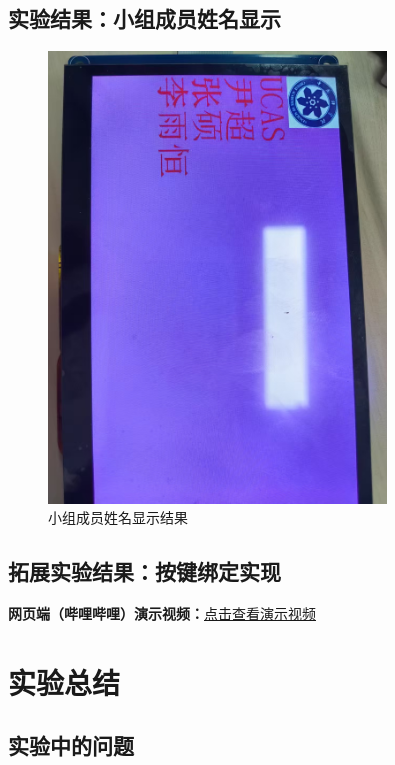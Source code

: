 \documentclass[UTF8]{article}
\theoremstyle{MyLineTheoremStyle} %
\theoremstyle{MyBlockTheoremStyle} %
\theoremstyle{MySubsubsectionStyle} %
\begin{document}
\subsection{实验结果：小组成员姓名显示}
\noindent
\begin{figure}[H]
    \centering
    \includegraphics[width=0.8\textwidth]{members.jpg}
    \caption{小组成员姓名显示结果}
    \label{fig:小组成员姓名显示结果}
\end{figure}

\subsection{拓展实验结果：按键绑定实现}
\noindent
\textbf{网页端（哔哩哔哩）演示视频：}\href{https://www.bilibili.com/video/BV1QcNEzAEv1/?vd_source=800127bf08c7aa59280ffeb458e19abc}{点击查看演示视频}


\section{实验总结}

\subsection{实验中的问题}
\end{document}
